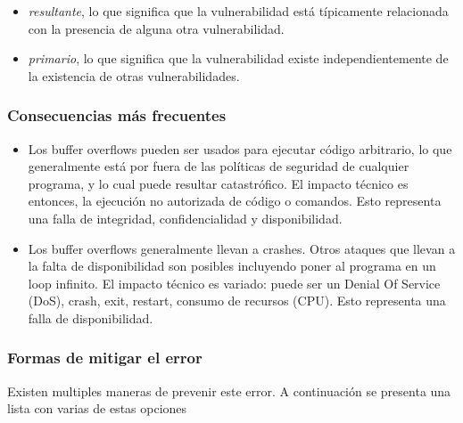 \begin{itemize}
    \item \textit{resultante}, lo que significa que la vulnerabilidad está típicamente relacionada con la presencia de alguna otra vulnerabilidad.
    \item \textit{primario}, lo que significa que la vulnerabilidad existe independientemente de la existencia de otras vulnerabilidades.
\end{itemize}

\subsubsection{Consecuencias más frecuentes}

\begin{itemize}
    \item Los buffer overflows pueden ser usados para ejecutar código arbitrario, lo que generalmente está por fuera de las políticas de seguridad de cualquier programa, 
     y lo cual puede resultar catastrófico. El impacto técnico es entonces, la ejecución no autorizada de código o comandos. Esto representa una falla de integridad, 
    confidencialidad y disponibilidad.
    \item Los buffer overflows generalmente llevan a crashes. Otros ataques que llevan a la falta de disponibilidad son posibles incluyendo poner al programa en un loop infinito.
    El impacto técnico es variado: puede ser un Denial Of Service (DoS), crash, exit, restart, consumo de recursos (CPU). Esto representa una falla de disponibilidad.
\end{itemize}

\subsubsection{Formas de mitigar el error}

Existen multiples maneras de prevenir este error. A continuación se presenta una lista con varias de estas opciones


